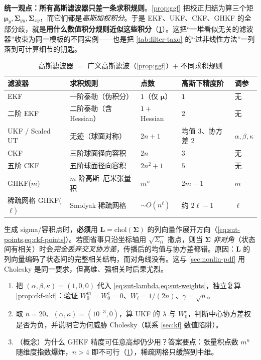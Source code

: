 \begin{insight}
\textbf{统一观点：所有高斯滤波器只差一条求积规则}\cite{barfoot2024state}。\cref{prop:ggf} 把校正归结为算三个矩 $\boldsymbol{\mu}_y,\boldsymbol{\Sigma}_{yy},\boldsymbol{\Sigma}_{xy}$，而它们都是\emph{高斯加权积分}。于是 EKF、UKF、CKF、GHKF 的全部分歧，就是\textbf{用什么数值积分规则近似这些积分}（\cref{tab:gauss-quadrature}）。这把“一堆看似无关的滤波器”收束为同一模板的不同实例——也是把 \cref{tab:filter-taxo} 的“过非线性方法”一列落到可计算细节的钥匙。
\end{insight}

\begin{table}[H]\centering\small
\caption{高斯滤波器 $=$ 广义高斯滤波（\cref{prop:ggf}）$+$ 不同求积规则}
\label{tab:gauss-quadrature}
\begin{tabular}{lllll}
\toprule
滤波器 & 求积规则 & 点数 & 高斯下精度阶 & 调参 \\
\midrule
EKF & 一阶泰勒（伪积分） & $1$（仅 $\boldsymbol{\mu}$） & $1$ & 无 \\
二阶 EKF & 二阶泰勒（含 Hessian） & $1+$Hessian & $2$ & 无 \\
UKF / Scaled UT & 无迹（球面对称） & $2n+1$ & 均值 $3$、协方差 $2$ & $\alpha,\beta,\kappa$ \\
CKF & 三阶球面径向容积 & $2n$ & $3$ & 无 \\
五阶 CKF & 五阶球面径向容积 & $2n^2+1$ & $5$ & 无 \\
GHKF($m$) & $m$ 阶高斯--厄米张量积 & $m^n$ & $2m-1$ & $m$ \\
稀疏网格 GHKF($\ell$) & Smolyak 稀疏网格 & $\sim O(n^{\ell})$ & 约 $2\ell-1$ & $\ell$ \\
\bottomrule
\end{tabular}
\end{table}

\begin{pitfall}
生成 sigma/容积点时，\textbf{必须}用 $\mathbf{L}=\mathrm{chol}(\boldsymbol{\Sigma})$ 的列向量作展开方向（\cref{eq:sut-points,eq:ckf-points}）。若图省事只沿坐标轴用 $\sqrt{\Sigma_{ii}}$ 撒点，则当 $\boldsymbol{\Sigma}$ \emph{非对角}（状态间有相关）时会\emph{完全丢弃交叉协方差}，传播后的均值与协方差都错。原因：$\mathbf{L}$ 的列向量编码了状态间的完整相关结构，而对角线没有。这与 \cref{sec:nonlin-pdf} 用 Cholesky 是同一要求，但高维、强相关时后果尤烈。
\end{pitfall}

\begin{practice}
\begin{enumerate}
  \item 把 $(\alpha,\beta,\kappa)=(1,0,0)$ 代入 \cref{eq:sut-lambda,eq:sut-weights}，独立复算 \cref{prop:ckf-ukf}：验证 $W_0^m=W_0^c=0$、$W_i=1/(2n)$、$\gamma=\sqrt{n}$。
  \item 取 $n=20$、$(\alpha,\kappa)=(10^{-3},0)$，算 UKF 的 $\lambda$ 与 $W_0^c$，判断中心协方差权是否为负，并说明它为何威胁 Cholesky（联系 \cref{sec:kf} 数值陷阱）。
  \item （概念）为什么 GHKF 精度可任意高却仍少用？答案要点：张量积点数 $m^n$ 随维度指数爆炸，$n>4$ 即不可行（\cref{tab:gauss-quadrature}），稀疏网格只缓解到中维。
\end{enumerate}
\end{practice}

